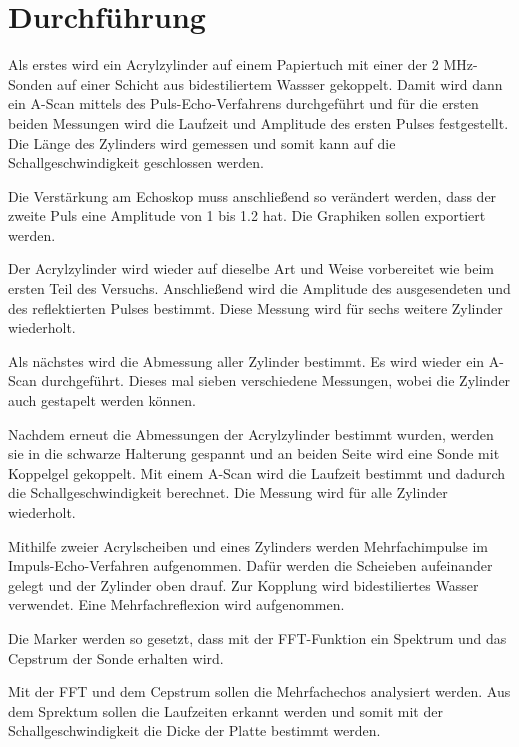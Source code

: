 \section{Durchführung}
\label{sec:Durchführung}


Als erstes wird ein Acrylzylinder auf einem Papiertuch mit einer der 2 MHz-Sonden auf einer Schicht aus bidestiliertem Wassser gekoppelt. Damit wird dann ein A-Scan mittels des Puls-Echo-Verfahrens durchgeführt und für die ersten beiden Messungen wird die Laufzeit und Amplitude des ersten Pulses festgestellt. 
Die Länge des Zylinders wird gemessen und somit kann auf die Schallgeschwindigkeit geschlossen werden. 

Die Verstärkung am Echoskop muss anschließend so verändert werden, dass der zweite Puls eine Amplitude von 1 bis 1.2 \si{\Volt} hat. Die Graphiken sollen exportiert werden.

Der Acrylzylinder wird wieder auf dieselbe Art und Weise vorbereitet wie beim ersten Teil des Versuchs. Anschließend wird die Amplitude des ausgesendeten und des reflektierten Pulses bestimmt. 
Diese Messung wird für sechs weitere Zylinder wiederholt. 

Als nächstes wird die Abmessung aller Zylinder bestimmt. Es wird wieder ein A-Scan durchgeführt. Dieses mal sieben verschiedene Messungen, wobei die Zylinder auch gestapelt werden können. 

Nachdem erneut die Abmessungen der Acrylzylinder bestimmt wurden, werden sie in die schwarze Halterung gespannt und an beiden Seite wird eine Sonde mit Koppelgel gekoppelt. 
Mit einem A-Scan wird die Laufzeit bestimmt und dadurch die Schallgeschwindigkeit berechnet. Die Messung wird für alle Zylinder wiederholt. 

Mithilfe zweier Acrylscheiben und eines Zylinders werden Mehrfachimpulse im Impuls-Echo-Verfahren aufgenommen. Dafür werden die Scheieben aufeinander gelegt und der Zylinder oben drauf. Zur Kopplung wird bidestiliertes Wasser verwendet. 
Eine Mehrfachreflexion wird aufgenommen. 

Die Marker werden so gesetzt, dass mit der FFT-Funktion ein Spektrum und das Cepstrum der Sonde erhalten wird. 

Mit der FFT und dem Cepstrum sollen die Mehrfachechos analysiert werden. Aus dem Sprektum sollen die Laufzeiten erkannt werden und somit mit der Schallgeschwindigkeit die Dicke der Platte bestimmt werden. 



